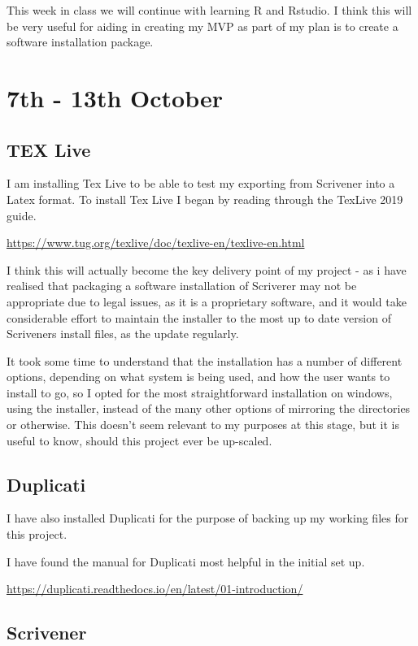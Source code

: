 \documentclass{article}
\begin{document}
This week in class we will continue with learning R and Rstudio. I think this will be very useful for aiding in creating my MVP as part of my plan is to create a software installation package.

\section{7th - 13th October}

\subsection{TEX Live}
I am installing Tex Live to be able to test my exporting from Scrivener into a Latex format. To install Tex Live I began by reading through the TexLive 2019 guide.

\url{https://www.tug.org/texlive/doc/texlive-en/texlive-en.html}

I think this will actually become the key delivery point of my project - as i have realised that packaging a software installation of Scriverer may not be appropriate due to legal issues, as it is a proprietary software, and it would take considerable effort to maintain the installer to the most up to date version of Scriveners install files, as the update regularly.

It took some time to understand that the installation has a number of different options, depending on what system is being used, and how the user wants to install to go, so I opted for the most straightforward installation on windows, using the installer, instead of the many other options of mirroring the directories or otherwise. 
This doesn't seem relevant to my purposes at this stage, but it is useful to know, should this project ever be up-scaled.



\subsection{Duplicati}

I have also installed Duplicati for the purpose of backing up my working files for this project. 

I have found the manual for Duplicati most helpful in the initial set up.

\url{https://duplicati.readthedocs.io/en/latest/01-introduction/}


\subsection{Scrivener}
\end{document}
